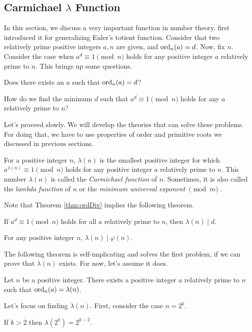 \documentclass{subfile}
\begin{document}
	\subsection{Carmichael \texorpdfstring{$\lambda$}{Lambda} Function}
	In this section, we discuss a very important function in number theory. \textcite{carmichael_1910} first introduced it for generalizing Euler's totient function. Consider that two relatively prime positive integers $a,n$ are given, and $\operatorname{ord}_n(a)=d$. Now, fix $n$. Consider the case when $a^d\equiv1\pmod n$ holds for any positive integer $a$ relatively prime to $n$. This brings up some questions.
	\begin{problem}\label{prob:CarmichaelQuestion1}
		Does there exists an $a$ such that $\operatorname{ord}_n(a)=d$?
	\end{problem}

	\begin{problem}\label{prob:CarmichaelQuestion2}
		How do we find the minimum $d$ such that $a^d\equiv1\pmod n$ holds for any $a$ relatively prime to $n$?
	\end{problem}
	Let's proceed slowly. We will develop the theories that can solve these problems. For doing that, we have to use properties of order and primitive roots we discussed in previous sections.
	\begin{definition}
		For a positive integer $n$, $\lambda(n)$ is the smallest positive integer for which $a^{\lambda(n)}\equiv1\pmod n$ holds for any positive integer $a$ relatively prime to $n$. This number $\lambda(n)$ is called the \textit{Carmichael function} of $n$. Sometimes, it is also called the \textit{lambda function} of $n$ or the \textit{minimum universal exponent} $\pmod m$ \textcite[Chapter $\S$VI, Section $4$, Page $265$]{sierpinski_schinzel_1988}.
	\end{definition}
	Note that Theorem \eqref{thm:ordDiv} implies the following theorem.
	\begin{theorem}\label{thm:carDiv}
		If $a^d\equiv1\pmod n$ holds for all $a$ relatively prime to $n$, then $\lambda(n)\mid d$.
	\end{theorem}

	\begin{corollary}\label{cor:LambdaDividesPhi}
		For any positive integer $n$, $\lambda(n)\mid \varphi(n)$.
	\end{corollary}
	The following theorem is self-implicating and solves the first problem, if we can prove that $\lambda(n)$ exists. For now, let's assume it does.
	\begin{theorem}
		Let $n$ be a positive integer. There exists a positive integer $a$ relatively prime to $n$ such that $\operatorname{ord}_n(a)=\lambda(n)$.
	\end{theorem}
	Let's focus on finding $\lambda(n)$. First, consider the case $n=2^k$.
	\begin{theorem}
		If $k>2$ then $\lambda(2^k)=2^{k-2}$.
	\end{theorem}
\end{document}
